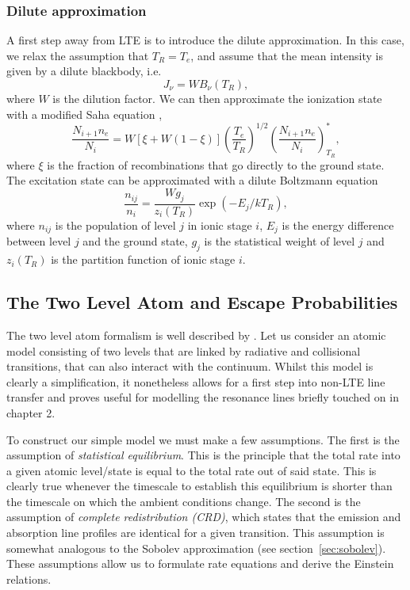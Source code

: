 \subsubsection{Dilute approximation}
\label{sec:dilute}
A first step away from LTE is to introduce the dilute approximation. In this case,
we relax the assumption that $T_R = T_e$, and assume that the mean intensity is given
by a dilute blackbody, i.e. 
\begin{equation}
J_\nu = W B_\nu (T_R),
\label{eq:dilute_jnu}
\end{equation}
where $W$ is the dilution factor. We can then approximate the ionization state
with a modified Saha equation \citep{AL85,ML93},
\begin{equation}
\frac{N_{i+1} n_e}{N_i} = W [\xi + W(1-\xi)]
\left(\frac{T_e}{T_R}\right)^{1/2}
\left(\frac{N_{i+1}n_e}{N_i}\right)^*_{T_R}, \label{eq:ml93}
\end{equation}
where $\xi$ is the fraction of recombinations that go directly to
the ground state.
The excitation state can be approximated with a dilute Boltzmann equation \citep{lucy1999sn}
\begin{equation}
\frac{n_{ij}}{n_i} = \frac{W g_j}{z_i(T_R)} \exp(-E_j/kT_R), 
\label{eq:dilute_boltzmann}
\end{equation}
where $n_{ij}$ is the population of level $j$ in ionic stage $i$,
$E_j$ is the energy difference between level $j$ and the ground state,
$g_j$ is the statistical weight of level $j$
and $z_i(T_R)$ is the partition function of ionic stage $i$. 

\subsection{The Two Level Atom and Escape Probabilities}

The two level atom formalism is well described by \cite{mihalas}.
Let us consider an atomic model consisting of two levels that are linked 
by radiative and collisional transitions, that can also interact with the 
continuum. Whilst this model is clearly a simplification, it nonetheless allows
for a first step into non-LTE line transfer and proves useful for modelling
the resonance lines briefly touched on in chapter 2.

To construct our simple model we must make a few assumptions. The first
is the assumption of {\em statistical equilibrium}. This is the principle 
that the total rate into a given atomic level/state is equal to the 
total rate out of said state. This is clearly true whenever the timescale
to establish this equilibrium is shorter than the timescale on which
the ambient conditions change. The second is the assumption of
{\em complete redistribution (CRD)}, which states that the emission
and absorption line profiles are identical for a given transition. This 
assumption is somewhat analogous to the Sobolev approximation 
(see section~\ref{sec:sobolev}). 
These assumptions allow us to formulate rate equations and derive the 
Einstein relations.

